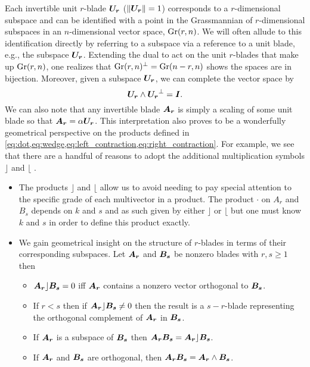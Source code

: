 Each invertible unit $r$-blade $\boldsymbol{U_r}$ ($\|\boldsymbol{U_r}\|=1$) corresponds to a $r$-dimensional subspace and can be identified with a point in the Grassmannian of $r$-dimensional subspaces in an $n$-dimensional vector space, $\operatorname{Gr}(r,n)$. We will often allude to this identification directly by referring to a subspace via a reference to a unit blade, e.g., the subspace $\boldsymbol{U_r}$. Extending the dual to act on the unit $r$-blades that make up $\operatorname{Gr}(r,n)$, one realizes that $\operatorname{Gr}(r,n)^\perp = \operatorname{Gr}(n-r,n)$ shows the spaces are in bijection. Moreover, given a subspace $\boldsymbol{U_r}$, we can complete the vector space by
\begin{equation}
\boldsymbol{U_r}\wedge \boldsymbol{U_r}^\perp = \boldsymbol{I}.
\end{equation} 
We can also note that any invertible blade $\boldsymbol{A_r}$ is simply a scaling of some unit blade so that $\boldsymbol{A_r} = \alpha \boldsymbol{U_r}$. This interpretation also proves to be a wonderfully geometrical perspective on the products defined in \cref{eq:dot,eq:wedge,eq:left_contraction,eq:right_contraction}. For example, we see that there are a handful of reasons to adopt the additional multiplication symbols $\rfloor$ and $\lfloor$ \cite{chisolm_geometric_2012}. 
\begin{itemize}
    \item The products $\rfloor$ and $\lfloor$ allow us to avoid needing to pay special attention to the specific grade of each multivector in a product. The product $\cdot$ on $A_r$ and $B_s$ depends on $k$ and $s$ and as such given by either $\rfloor$ or $\lfloor$ but one must know $k$ and $s$ in order to define this product exactly. 
    \item We gain geometrical insight on the structure of $r$-blades in terms of their corresponding subspaces. Let $\boldsymbol{A_r}$ and $\boldsymbol{B_s}$ be nonzero blades with $r,s\geq 1$ then
    \begin{itemize}
        \item $\boldsymbol{A_r} \rfloor \boldsymbol{B_s} =0$ iff $\boldsymbol{A_r}$ contains a nonzero vector orthogonal to $\boldsymbol{B_s}$.
        \item If $r<s$ then if $\boldsymbol{A_r}\rfloor \boldsymbol{B_s} \neq 0$ then the result is a $s-r$-blade representing the orthogonal complement of $\boldsymbol{A_r}$ in $\boldsymbol{B_s}$.
        \item If $\boldsymbol{A_r}$ is a subspace of $\boldsymbol{B_s}$ then $\boldsymbol{A_r}\boldsymbol{B_s} = \boldsymbol{A_r}\rfloor \boldsymbol{B_s}$.
        \item If $\boldsymbol{A_r}$ and $\boldsymbol{B_s}$ are orthogonal, then $\boldsymbol{A_r}\boldsymbol{B_s} = \boldsymbol{A_r} \wedge \boldsymbol{B_s}$.
    \end{itemize}
\end{itemize}


